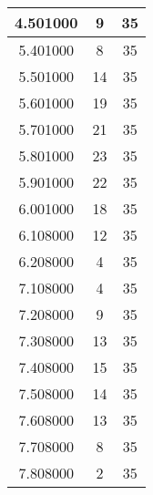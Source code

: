 \begin{longtable}[htbp]{|c|c|c|}
4.501000 & 9 & 35 \\ \hline
5.401000 & 8 & 35 \\ \hline
5.501000 & 14 & 35 \\ \hline
5.601000 & 19 & 35 \\ \hline
5.701000 & 21 & 35 \\ \hline
5.801000 & 23 & 35 \\ \hline
5.901000 & 22 & 35 \\ \hline
6.001000 & 18 & 35 \\ \hline
6.108000 & 12 & 35 \\ \hline
6.208000 & 4 & 35 \\ \hline
7.108000 & 4 & 35 \\ \hline
7.208000 & 9 & 35 \\ \hline
7.308000 & 13 & 35 \\ \hline
7.408000 & 15 & 35 \\ \hline
7.508000 & 14 & 35 \\ \hline
7.608000 & 13 & 35 \\ \hline
7.708000 & 8 & 35 \\ \hline
7.808000 & 2 & 35 \\ \hline
\end{longtable}
